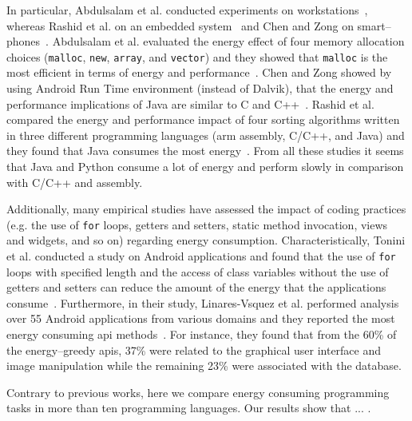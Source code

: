 In particular, Abdulsalam et al. conducted experiments on workstations~\cite{ALG14},
whereas Rashid et al. on an embedded system~\cite{RAT15} and
Chen and Zong on smart--phones~\cite{CZ16}.
Abdulsalam et al. evaluated the energy effect of four memory
allocation choices ({\tt malloc}, {\tt new}, {\tt array}, and {\tt vector})
and they showed that {\tt malloc} is the most efficient
in terms of energy and performance~\cite{ALG14}.
Chen and Zong showed by using Android Run Time
environment (instead of Dalvik),
that the energy and performance implications of Java
are similar to C and C++~\cite{CZ16}.
Rashid et al. compared the energy and performance
impact of four sorting algorithms
written in three different programming languages
({\sc arm} assembly, C/C++, and Java) and
they found that Java consumes the most energy~\cite{RAT15}.
From all these studies it seems that
Java and Python consume a lot of energy and
perform slowly in comparison with C/C++ and assembly.

Additionally, many empirical studies have assessed the impact
of coding practices
(e.g. the use of {\tt for} loops, getters and setters,
static method invocation, views and widgets, and so on)
regarding energy consumption.
Characteristically,
Tonini et al. conducted a study on Android applications
and found that the use of {\tt for} loops with specified length
and the access of class variables without the use of getters and setters
can reduce the amount of the energy that
the applications consume~\cite{TFM13}.
Furthermore, 
in their study, Linares-Vsquez et al. performed analysis
over 55 Android applications from various domains
and they reported
the most energy consuming {\sc api} methods~\cite{LBB14}.
For instance, they found that
from the 60\% of the energy--greedy {\sc api}s,
37\% were related to the graphical user interface and
image manipulation while the remaining 23\% were associated with the database.

Contrary to previous works,
here we compare energy consuming programming tasks
in more than ten programming languages.
Our results show that ... . %
